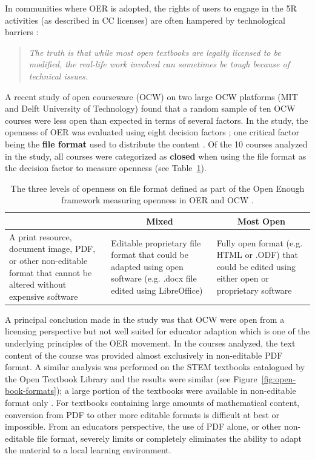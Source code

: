 \documentclass[11pt]{article}
\begin{document}
In communities where OER is adopted, the rights of users to engage in the 5R activities (as described in CC licenses) are often hampered by technological barriers \cite{CC:16, SO:19, MM-EC:19, CE:22}:
\begin{quote}\em
  The truth is that while most open textbooks are legally licensed to be modified, the real-life work involved can sometimes be tough because of technical issues. \cite{CC:16}
\end{quote}
A recent study of open courseware (OCW) on two large OCW platforms (MIT and Delft University of Technology) found that a random sample of ten OCW courses were less open than expected in terms of several factors.  In the study, the openness of OER was evaluated using eight decision factors \cite{MM-EC:19}; one critical factor being the \textbf{file format} used to distribute the content \cite{CE:22}. Of the 10 courses analyzed in the study, all courses were categorized as \textbf{closed} when using the file format as the decision factor to measure openness (see Table~\ref{tab:open-enough}).
\begin{table}
\centering
\renewcommand{\arraystretch}{1.5}
\begin{tabular}{p{5cm}p{5cm}p{5cm}}\hline  
  \rowcolor{Gray}
  \multicolumn{1}{c}{\textbf{Closed}} & \multicolumn{1}{c}{\textbf{Mixed}} & \multicolumn{1}{c}{\textbf{Most Open}}\\ \hline 
A print resource, document image, PDF, or other non-editable format that cannot be altered without expensive software & Editable proprietary file format that could be adapted using open software (e.g. .docx file edited using LibreOffice) & Fully open format (e.g. HTML or .ODF) that could be edited using either open or proprietary software\\[1ex] \hline
\end{tabular}
\caption{The three levels of openness on file format defined as part of the Open Enough framework measuring openness in OER and OCW \cite{MM-EC:19}.}
\label{tab:open-enough}
\end{table}
A principal conclusion made in the study was that OCW were open from a licensing perspective but not well suited for educator adaption which is one of the underlying principles of the OER movement.  In the courses analyzed, the text content of the course was provided almost exclusively in non-editable PDF format.  A similar analysis was performed on the STEM textbooks catalogued by the Open Textbook Library and the results were similar (see Figure~\ref{fig:open-book-formats}); a large portion of the textbooks were available in non-editable format only \cite{CA:22}.  For textbooks containing large amounts of mathematical content, conversion from PDF to other more editable formats is difficult at best or impossible.  From an educators perspective, the use of PDF alone, or other non-editable file format, severely limits or completely eliminates the ability to adapt the material to a local learning environment.
\end{document}

